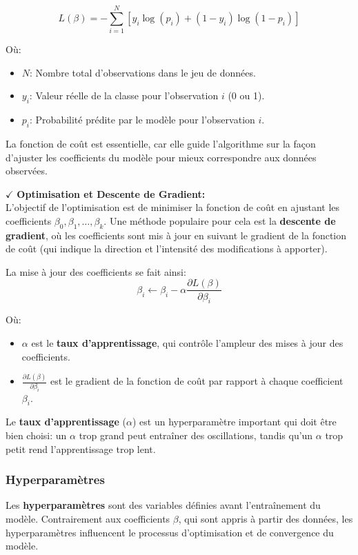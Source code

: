 \[
L(\beta) = -\sum_{i=1}^{N} [y_i \log(p_i) + (1 - y_i) \log(1 - p_i)]
\]

Où:
\begin{itemize}
    \item \( N \): Nombre total d'observations dans le jeu de données.
    \item \( y_i \): Valeur réelle de la classe pour l'observation \( i \) (0 ou 1).
    \item \( p_i \): Probabilité prédite par le modèle pour l'observation \( i \).
\end{itemize}

La fonction de coût est essentielle, car elle guide l'algorithme sur la façon d'ajuster les coefficients du modèle pour mieux correspondre aux données observées.

\textbf{\(\checkmark\)} \textbf{Optimisation et Descente de Gradient:}\\
L’objectif de l’optimisation est de minimiser la fonction de coût en ajustant les coefficients \( \beta_0, \beta_1, \dots, \beta_k \). Une méthode populaire pour cela est la \textbf{descente de gradient}, où les coefficients sont mis à jour en suivant le gradient de la fonction de coût (qui indique la direction et l'intensité des modifications à apporter).

La mise à jour des coefficients se fait ainsi:
\[
\beta_i \leftarrow \beta_i - \alpha \frac{\partial L(\beta)}{\partial \beta_i}
\]

Où:
\begin{itemize}
    \item \( \alpha \) est le \textbf{taux d'apprentissage}, qui contrôle l'ampleur des mises à jour des coefficients.
    \item \( \frac{\partial L(\beta)}{\partial \beta_i} \) est le gradient de la fonction de coût par rapport à chaque coefficient \( \beta_i \).
\end{itemize}

Le \textbf{taux d'apprentissage} (\( \alpha \)) est un hyperparamètre important qui doit être bien choisi: un \( \alpha \) trop grand peut entraîner des oscillations, tandis qu'un \( \alpha \) trop petit rend l’apprentissage trop lent.
\subsubsection{Hyperparamètres}

Les \textbf{hyperparamètres} sont des variables définies avant l’entraînement du modèle. Contrairement aux coefficients \( \beta \), qui sont appris à partir des données, les hyperparamètres influencent le processus d'optimisation et de convergence du modèle.

